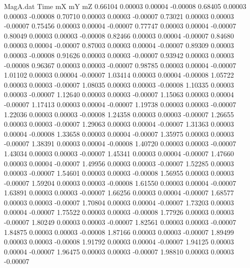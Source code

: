 \begin{filecontents}{MagA.dat}
Time mX mY mZ
   0.66104    0.00003    0.00004   -0.00008
   0.68405    0.00003    0.00003   -0.00008
   0.70710    0.00003    0.00003   -0.00007
   0.73021    0.00003    0.00003   -0.00007
   0.75456    0.00003    0.00004   -0.00007
   0.77747    0.00003    0.00004   -0.00007
   0.80049    0.00003    0.00003   -0.00008
   0.82466    0.00003    0.00004   -0.00007
   0.84680    0.00003    0.00004   -0.00007
   0.87003    0.00003    0.00004   -0.00007
   0.89309    0.00003    0.00003   -0.00008
   0.91626    0.00003    0.00003   -0.00007
   0.93942    0.00003    0.00003   -0.00008
   0.96367    0.00003    0.00003   -0.00007
   0.98785    0.00003    0.00004   -0.00007
   1.01102    0.00003    0.00004   -0.00007
   1.03414    0.00003    0.00004   -0.00008
   1.05722    0.00003    0.00003   -0.00007
   1.08035    0.00003    0.00003   -0.00008
   1.10335    0.00003    0.00003   -0.00007
   1.12640    0.00003    0.00003   -0.00007
   1.15063    0.00003    0.00004   -0.00007
   1.17413    0.00003    0.00004   -0.00007
   1.19738    0.00003    0.00003   -0.00007
   1.22036    0.00003    0.00003   -0.00008
   1.24358    0.00003    0.00003   -0.00007
   1.26655    0.00003    0.00003   -0.00007
   1.29063    0.00003    0.00004   -0.00007
   1.31363    0.00003    0.00004   -0.00008
   1.33658    0.00003    0.00004   -0.00007
   1.35975    0.00003    0.00003   -0.00007
   1.38391    0.00003    0.00004   -0.00008
   1.40720    0.00003    0.00003   -0.00007
   1.43034    0.00003    0.00003   -0.00007
   1.45341    0.00003    0.00004   -0.00007
   1.47660    0.00003    0.00004   -0.00007
   1.49956    0.00003    0.00003   -0.00007
   1.52285    0.00003    0.00003   -0.00007
   1.54601    0.00003    0.00003   -0.00008
   1.56955    0.00003    0.00003   -0.00007
   1.59204    0.00003    0.00003   -0.00008
   1.61550    0.00003    0.00004   -0.00007
   1.63891    0.00003    0.00003   -0.00007
   1.66256    0.00003    0.00004   -0.00007
   1.68577    0.00003    0.00003   -0.00007
   1.70804    0.00003    0.00004   -0.00007
   1.73203    0.00003    0.00004   -0.00007
   1.75522    0.00003    0.00003   -0.00008
   1.77926    0.00003    0.00003   -0.00007
   1.80249    0.00003    0.00003   -0.00007
   1.82561    0.00003    0.00003   -0.00007
   1.84875    0.00003    0.00003   -0.00008
   1.87166    0.00003    0.00003   -0.00007
   1.89499    0.00003    0.00003   -0.00008
   1.91792    0.00003    0.00004   -0.00007
   1.94125    0.00003    0.00004   -0.00007
   1.96475    0.00003    0.00003   -0.00007
   1.98810    0.00003    0.00003   -0.00007

\end{filecontents}
